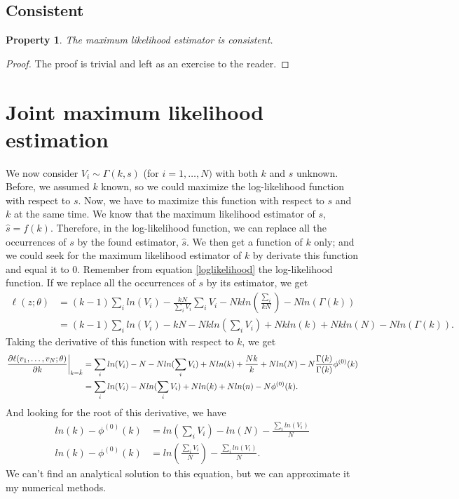 \documentclass[final]{aomart}
\newtheorem[{}\it]{thm}{Theorem}[section]
\newtheorem{prop}[thm]{Property}
\theoremstyle{definition}
\newtheorem*[{}\it]{notation}{Notation}
\numberwithin{equation}{section}
\newcommand{\eval}[2][\right]{\relax
  \ifx#1\right\relax \left.\fi#2#1\rvert}
\begin{document}
\subsection{Consistent}
\begin{prop}
	The maximum likelihood estimator is consistent.
\end{prop}
\begin{proof}
	The proof is trivial and left as an exercise to the reader.
\end{proof}
\section{Joint maximum likelihood estimation}
We now consider \(V_i \sim \Gamma(k, s)\) (for \(i = 1,\ldots,N)\) with both \(k\) and \(s\) unknown. Before, we assumed \(k\) known, so we could maximize the log-likelihood function with respect to \(s\). Now, we have to maximize this function with respect to \(s\) and \(k\) at the same time. We know that the maximum likelihood estimator of \(s\), \(\hat{s} = f(k)\). Therefore, in the log-likelihood function, we can replace all the occurrences of \(s\) by the found estimator, \(\hat{s}\). We then get a function of \(k\) only; and we could seek for the maximum likelihood estimator of \(k\) by derivate this function and equal it to 0. Remember from equation \ref{loglikelihood} the log-likelihood function. If we replace all the occurrences of \(s\) by its estimator, we get
\begin{equation}
	\begin{aligned}
\ell(z;\theta) & = (k-1)\sum_iln(V_i) - \frac{kN}{\sum_iV_i}\sum_iV_i - Nkln(\frac{\sum_i}{kN}) - Nln(\Gamma(k))\\
						   & = (k-1)\sum_iln(V_i) - kN - Nkln(\sum_iV_i) +Nkln(k) + Nkln(N) - Nln(\Gamma(k)).
	\end{aligned}
\end{equation}
Taking the derivative of this function with respect to \(k\), we get
\begin{equation}
	\begin{aligned}
		\eval{\frac{\partial \ell(v_1, \ldots, v_N; \theta)}{\partial k}}_{k = \hat{k}} & = \sum_iln(V_i) - N - Nln(\sum_iV_i) + Nln(k) + \frac{Nk}{k} + Nln(N) - N\frac{\Gamma(k)}{\Gamma(k)}\phi^{(0)}(k)\\
		 & = \sum_iln(V_i) - Nln(\sum_iV_i) + Nln(k) + Nln(n) - N\phi^{(0)}(k).
	\end{aligned}
\end{equation}
And looking for the root of this derivative, we have
\begin{equation}
	\begin{aligned}
		ln(k) - \phi^{(0)}(k) & = ln(\sum_iV_i) - ln(N) - \frac{\sum_iln(V_i)}{N}\\
		ln(k) - \phi^{(0)}(k) & = ln(\frac{\sum_iV_i}{N}) - \frac{\sum_iln(V_i)}{N}.
	\end{aligned}
\end{equation}
We can't find an analytical solution to this equation, but we can approximate it my numerical methods.
\end{document}
